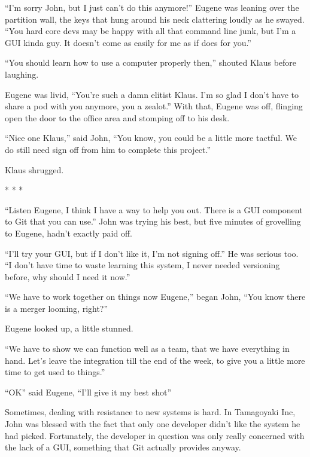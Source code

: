 \begin{trenches}
``I'm sorry John, but I just can't do this anymore!''  Eugene was leaning over the partition wall, the keys that hung around his neck clattering loudly as he swayed.  ``You hard core devs may be happy with all that command line junk, but I'm a GUI kinda guy.  It doesn't come as easily for me as if does for you.''

``You should learn how to use a computer properly then,'' shouted Klaus before laughing.

Eugene was livid, ``You're such a damn elitist Klaus.  I'm so glad I don't have to share a pod with you anymore, you a zealot.''  With that, Eugene was off, flinging open the door to the office area and stomping off to his desk.

``Nice one Klaus,'' said John, ``You know, you could be a little more tactful.  We do still need sign off from him to complete this project.''

Klaus shrugged.

\begin{center} * * * \end{center}

``Listen Eugene, I think I have a way to help you out.  There is a GUI component to Git that you can use.''  John was trying his best, but five minutes of grovelling to Eugene, hadn't exactly paid off.

``I'll try your GUI, but if I don't like it, I'm not signing off.''  He was serious too.  ``I don't have time to waste learning this system, I never needed versioning before, why should I need it now.''

``We have to work together on things now Eugene,'' began John, ``You know there is a merger looming, right?''  

Eugene looked up, a little stunned.

``We have to show we can function well as a team, that we have everything in hand.  Let's leave the integration till the end of the week, to give you a little more time to get used to things.''

``OK'' said Eugene, ``I'll give it my best shot''
\end{trenches}

Sometimes, dealing with resistance to new systems is hard.  In Tamagoyaki Inc, John was blessed with the fact that only one developer didn't like the system he had picked.  Fortunately, the developer in question was only really concerned with the lack of a GUI, something that Git actually provides anyway.


